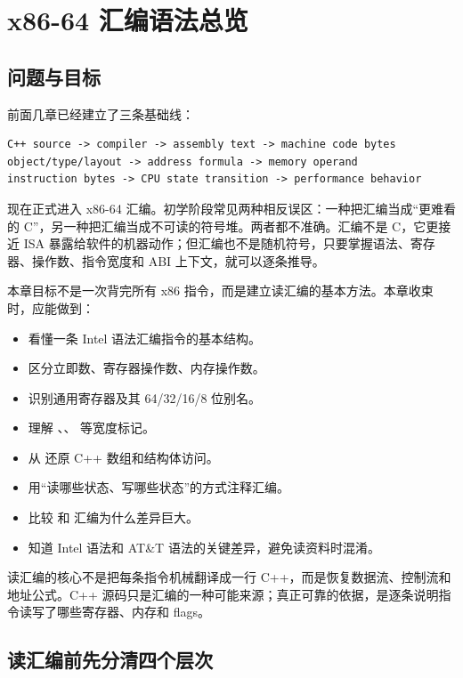 \chapter{x86-64 汇编语法总览}

\section{问题与目标}

前面几章已经建立了三条基础线：

\begin{lstlisting}
C++ source -> compiler -> assembly text -> machine code bytes
object/type/layout -> address formula -> memory operand
instruction bytes -> CPU state transition -> performance behavior
\end{lstlisting}

现在正式进入 x86-64 汇编。初学阶段常见两种相反误区：一种把汇编当成“更难看的 C”，另一种把汇编当成不可读的符号堆。两者都不准确。汇编不是 C，它更接近 ISA 暴露给软件的机器动作；但汇编也不是随机符号，只要掌握语法、寄存器、操作数、指令宽度和 ABI 上下文，就可以逐条推导。

本章目标不是一次背完所有 x86 指令，而是建立读汇编的基本方法。本章收束时，应能做到：

\begin{itemize}
  \item 看懂一条 Intel 语法汇编指令的基本结构。
  \item 区分立即数、寄存器操作数、内存操作数。
  \item 识别通用寄存器及其 64/32/16/8 位别名。
  \item 理解 、、 等宽度标记。
  \item 从  还原 C++ 数组和结构体访问。
  \item 用“读哪些状态、写哪些状态”的方式注释汇编。
  \item 比较  和  汇编为什么差异巨大。
  \item 知道 Intel 语法和 AT\&T 语法的关键差异，避免读资料时混淆。
\end{itemize}

\begin{keyidea}
读汇编的核心不是把每条指令机械翻译成一行 C++，而是恢复数据流、控制流和地址公式。C++ 源码只是汇编的一种可能来源；真正可靠的依据，是逐条说明指令读写了哪些寄存器、内存和 flags。
\end{keyidea}

\section{读汇编前先分清四个层次}

